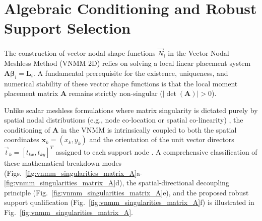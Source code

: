 \documentclass[preprint,12pt]{elsarticle}
\begin{document}
\section{Algebraic Conditioning and Robust Support Selection}
\label{sec:conditioning}

The construction of vector nodal shape functions $\vec{N}_i$ in the Vector Nodal Meshless Method (VNMM 2D) \cite{ortiz2021nodal, ortiz2023tese} relies on solving a local linear placement system $\mathbf{A} \boldsymbol{\beta}_i = \mathbf{L}_i$. A fundamental prerequisite for the existence, uniqueness, and numerical stability of these vector shape functions is that the local moment placement matrix $\mathbf{A}$ remains strictly non-singular ($|\det(\mathbf{A})| > 0$).

Unlike scalar meshless formulations where matrix singularity is dictated purely by spatial nodal distributions (e.g., node co-location or spatial co-linearity) \cite{lima2017edge}, the conditioning of $\mathbf{A}$ in the VNMM is intrinsically coupled to both the spatial coordinates $\mathbf{x}_k = (x_k, y_k)$ and the orientation of the unit vector directors $\vec{t}_k = [t_{kx}, t_{ky}]^T$ assigned to each support node \cite{ortiz2021nodal, goncalves2025tese}. A comprehensive classification of these mathematical breakdown modes (Figs.~\ref{fig:vnmm_singularities_matrix_A}a-\ref{fig:vnmm_singularities_matrix_A}d), the spatial-directional decoupling principle (Fig.~\ref{fig:vnmm_singularities_matrix_A}e), and the proposed robust support qualification (Fig.~\ref{fig:vnmm_singularities_matrix_A}f) is illustrated in Fig.~\ref{fig:vnmm_singularities_matrix_A}.
\end{document}
